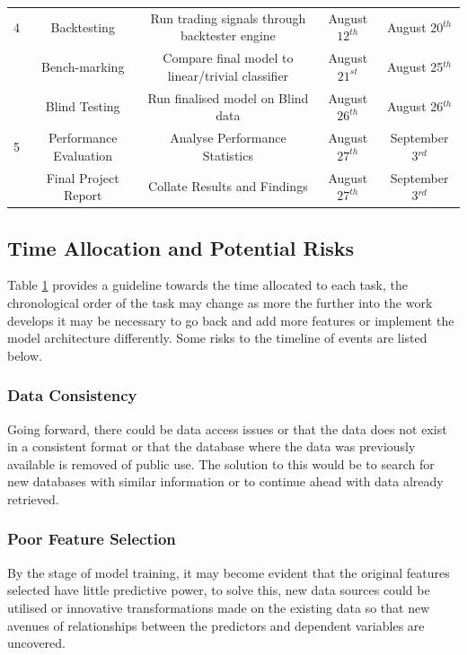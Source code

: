 \documentclass[11pt, a4paper]{article}
\begin{document}
\begin{table}
\begin{tabular}{c | c c c c}
 4  		& Backtesting                  & Run trading signals through backtester engine                   & August$12^{th}$ & August 20$^{th}$ \\
     		& Bench-marking            & Compare final model to linear/trivial classifier                    & August$21^{st}$ & August 25$^{th}$ \\
\hline
 	    	& Blind Testing                & Run finalised model on Blind data                                    & August$26^{th}$ & August 26$^{th}$\\
5       	& Performance Evaluation & Analyse Performance Statistics                                       & August$27^{th}$ & September 3$^{rd}$\\        %
		& Final Project Report       & Collate Results and Findings                        		       & August$27^{th}$ & September 3$^{rd}$\\  [1ex]
\hline     %
\end{tabular} \label{table:nonlin}  %
\end{table} 
\clearpage

\subsection{Time Allocation and Potential Risks}
Table \ref{table:nonlin} provides a guideline towards the time allocated to each task, the chronological order of the task may change as more the further into the work develops it may be necessary to go back and add more features or implement the model architecture differently. Some risks to the timeline of events are listed below.

\subsubsection{Data Consistency}
Going forward, there could be data access issues or that the data does not exist in a consistent format or that the database where the data was previously available is removed of public use. The solution to this would be to search for new databases with similar information or to continue ahead with data already retrieved.
\subsubsection{Poor Feature Selection}
By the stage of model training, it may become evident that the original features selected have little predictive power, to solve this, new data sources could be utilised or innovative transformations made on the existing data so that new avenues of relationships between the predictors and dependent variables are uncovered.
\end{document}
